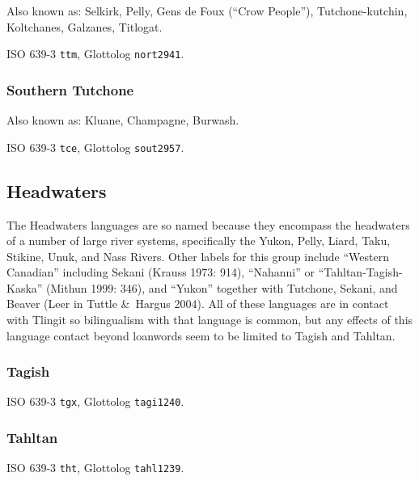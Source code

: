 \documentclass[12pt,letterpaper,oneside,article]{memoir}
\begin{document}
Also known as: Selkirk, Pelly, Gens de Foux (“Crow People”), Tutchone-kutchin, Koltchanes, Galzanes, Titlogat.

ISO 639-3 \texttt{ttm}, Glottolog \texttt{nort2941}.

\subsubsection{Southern Tutchone}\label{sec:stutchone}

Also known as: Kluane, Champagne, Burwash.

ISO 639-3 \texttt{tce}, Glottolog \texttt{sout2957}.

\subsection{Headwaters}\label{sec:dene-cord-headwaters}

The Headwaters languages are so named because they encompass the headwaters of a number of large river systems, specifically the Yukon, Pelly, Liard, Taku, Stikine, Unuk, and Nass Rivers.
Other labels for this group include “Western Canadian” including Sekani (Krauss 1973: 914), “Nahanni” or “Tahltan-Tagish-Kaska” (Mithun 1999: 346), and “Yukon” together with Tutchone, Sekani, and Beaver (Leer in Tuttle \&\ Hargus 2004).
All of these languages are in contact with Tlingit so bilingualism with that language is common, but any effects of this language contact beyond loanwords seem to be limited to Tagish and Tahltan.

\subsubsection{Tagish}\label{sec:tagish}

ISO 639-3 \texttt{tgx}, Glottolog \texttt{tagi1240}.


\subsubsection{Tahltan}\label{sec:tahltan}

ISO 639-3 \texttt{tht}, Glottolog \texttt{tahl1239}.
\end{document}
